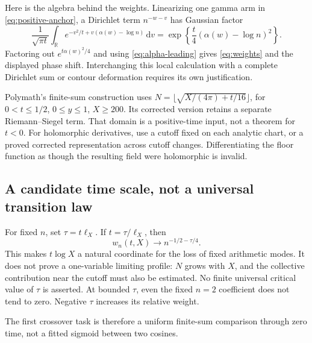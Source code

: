 \documentclass[11pt]{article}
\newcommand{\R}{\mathbb R}
\newcommand{\dd}{\,\mathrm d}
\numberwithin{equation}{section}
\begin{document}
Here is the algebra behind the weights. Linearizing one gamma arm in
\eqref{eq:positive-anchor}, a Dirichlet term \(n^{-w-v}\) has Gaussian
factor
\[
\frac1{\sqrt{\pi t}}\int_\R
 e^{-v^2/t+v(\alpha(w)-\log n)}\dd v
 =\exp\left\{\frac t4(\alpha(w)-\log n)^2\right\}.
\]
Factoring out \(e^{t\alpha(w)^2/4}\) and using
\eqref{eq:alpha-leading} gives \eqref{eq:weights} and the displayed
phase shift. Interchanging this local calculation with a complete
Dirichlet sum or contour deformation requires its own justification.

Polymath's finite-sum construction \cite[Eqs.~(14)--(19)]{polymath}
uses \(N=\lfloor\sqrt{X/(4\pi)+t/16}\rfloor\), for
\(0<t\le1/2\), \(0\le y\le1\), \(X\ge200\). Its corrected version
retains a separate Riemann--Siegel term. That domain is a positive-time
input, not a theorem for \(t<0\). For holomorphic derivatives, use a
cutoff fixed on each analytic chart, or a proved corrected
representation across cutoff changes. Differentiating the floor
function as though the resulting field were holomorphic is invalid.

\subsection{A candidate time scale, not a universal transition law}
For fixed \(n\), set \(\tau=t\ell_X\). If \(t=\tau/\ell_X\), then
\begin{equation}
w_n(t,X)\longrightarrow n^{-1/2-\tau/4}. \label{eq:tau}
\end{equation}
This makes \(t\log X\) a natural coordinate for the loss of fixed
arithmetic modes. It does not prove a one-variable limiting profile:
\(N\) grows with \(X\), and the collective contribution near the cutoff
must also be estimated. No finite universal critical value of \(\tau\)
is asserted. At bounded \(\tau\), even the fixed \(n=2\) coefficient
does not tend to zero. Negative \(\tau\) increases its relative weight.

The first crossover task is therefore a uniform finite-sum comparison
through zero time, not a fitted sigmoid between two cosines.
\end{document}

